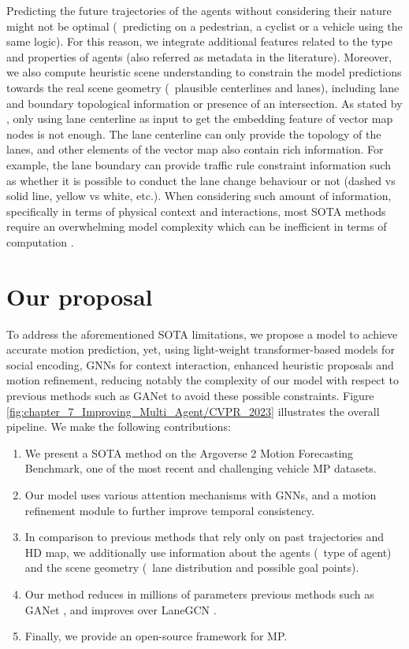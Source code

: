 Predicting the future trajectories of the agents without considering their nature might not be optimal (\eg \ predicting on a pedestrian, a cyclist or a vehicle using the same logic). For this reason, we integrate additional features related to the type and properties of agents (also referred as metadata in the literature). Moreover, we also compute heuristic scene understanding to constrain the model predictions towards the real scene geometry (\eg \ plausible centerlines and lanes), including lane and boundary topological information or presence of an intersection. 
As stated by \cite{zhang2022banet}, only using lane centerline as input to get the embedding feature of vector map nodes is not enough. The lane centerline can only provide the
topology of the lanes, and other elements of the vector map also contain rich information. For example, the lane boundary can provide traffic rule constraint information such as whether it is possible to conduct the lane change behaviour or not (dashed vs solid line, yellow vs white, etc.). When considering such amount of information, specifically in terms of physical context and interactions, most \ac{SOTA} methods require an overwhelming model complexity which can be inefficient in terms of computation \cite{gao2020vectornet, walters2020trajectory, can2022maps}.

\section{Our proposal}
\label{sec:7_our_proposal}

To address the aforementioned \ac{SOTA} limitations, we propose a model \cite{gomez2023improving} to achieve accurate motion prediction, yet, using light-weight transformer-based models for social encoding, \acp{GNN} for context interaction, enhanced heuristic proposals and motion refinement, reducing notably the complexity of our model with respect to previous methods such as GANet \cite{wang2022ganet} to avoid these possible constraints. Figure \ref{fig:chapter_7_Improving_Multi_Agent/CVPR_2023} illustrates the overall pipeline. We make the following contributions:

\begin{enumerate}
	\item We present a \ac{SOTA} method on the Argoverse 2 Motion Forecasting Benchmark, one of the most recent and challenging vehicle \ac{MP} datasets.
	\item Our model uses various attention mechanisms with GNNs, and a motion refinement module to further improve temporal consistency.
	\item In comparison to previous methods that rely only on past trajectories and HD map, we additionally use information about the agents (\eg \ type of agent) and the scene geometry (\eg \ lane distribution and possible goal points).
	\item Our method reduces in millions of parameters previous methods such as GANet \cite{wang2022ganet}, and improves over LaneGCN \cite{liang2020learning}.
	\item Finally, we provide an open-source framework for MP.
\end{enumerate}

